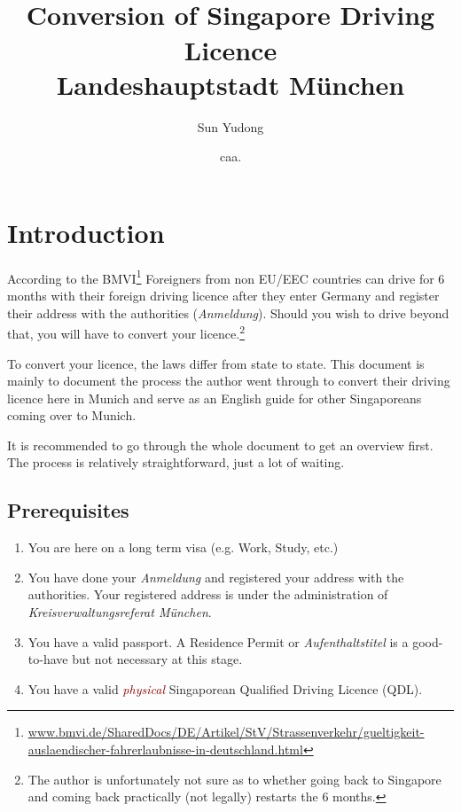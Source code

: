 \documentclass{article}
\title{\vspace{-1cm}{\large Unofficial Guide}\\Conversion of Singapore Driving Licence \\ {\large Landeshauptstadt München}}
\author{Sun Yudong}
\date{{\normalsize caa.} \datum}
\newcommand{\de}[1]{\textcolor{NavyBlue}{\textit{#1}}}
\newcommand{\impt}[1]{\textcolor{Maroon}{#1}}
\begin{document}
\maketitle

\section{Introduction}
    According to the BMVI\footnote{\scriptsize \url{www.bmvi.de/SharedDocs/DE/Artikel/StV/Strassenverkehr/gueltigkeit-auslaendischer-fahrerlaubnisse-in-deutschland.html}} Foreigners from non EU/EEC countries can drive for 6 months with their foreign driving licence after they enter Germany and register their address with the authorities (\de{Anmeldung}). Should you wish to drive beyond that, you will have to convert your licence.\footnote{The author is unfortunately not sure as to whether going back to Singapore and coming back practically (not legally) restarts the 6 months.}
    
    To convert your licence, the laws differ from state to state. This document is mainly to document the process the author went through to convert their driving licence here in Munich and serve as an English guide for other Singaporeans coming over to Munich. 
    
    It is recommended to go through the whole document to get an overview first. The process is relatively straightforward, just a lot of waiting.
    
        \subsection{Prerequisites}
        \begin{enumerate}
            \item You are here on a long term visa (e.g. Work, Study, etc.)
            \item You have done your \de{Anmeldung} and registered your address with the authorities. Your registered address is under the administration of \de{Kreisverwaltungsreferat München}. 
            \item You have a valid passport. A Residence Permit or \de{Aufenthaltstitel} is a good-to-have but not necessary at this stage. 
            \item You have a valid \impt{\textit{physical}} Singaporean Qualified Driving Licence (QDL).
        \end{enumerate}
        
\end{document}
